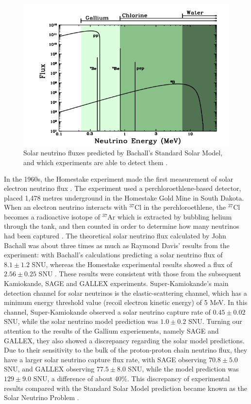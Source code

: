 \begin{figure}
    \centering
    \includegraphics[width=\textwidth]{Figures/nu_energy_bachall.png}
    \caption{Solar neutrino fluxes predicted by Bachall's Standard Solar Model, and which experiments are able to detect them \cite{Bahcall_2003}.}
    \label{fig:nu_energy_bachall}
\end{figure}

In the 1960s, the Homestake experiment made the first measurement of solar electron neutrino flux \cite{homestake_davis}. The experiment used a perchloroethlene-based detector, placed 1,478 metres underground in the Homestake Gold Mine in South Dakota. When an electron neutrino interacts with ${ }^{37} \mathrm{Cl}$ in the perchloroethlene, the ${ }^{37} \mathrm{Cl}$ becomes a radioactive isotope of ${ }^{37} \mathrm{Ar}$ which is extracted by bubbling helium through the tank, and then counted in order to determine how many neutrinos had been captured \cite{davis1994review}. The theoretical solar neutrino flux calculated by John Bachall was about three times as much as Raymond Davis' results from the experiment: with Bachall's calculations predicting a solar neutrino flux of $8.1 \pm 1.2$ SNU, whereas the Homestake experimental results showed a flux of $2.56 \pm 0.25$ SNU \cite{JKonijn1999}. These results were consistent with those from the subsequent Kamiokande, SAGE and GALLEX experiments. Super-Kamiokande's main detection channel for solar neutrinos is the elastic-scattering channel, which has a minimum energy threshold value (recoil electron kinetic energy) of 5 MeV. In this channel, Super-Kamiokande observed a solar neutrino capture rate of $0.45 \pm 0.02$ SNU, while the solar neutrino model prediction was $1.0 \pm 0.2$ SNU. Turning our attention to the results of the Gallium experiements, namely SAGE and GALLEX, they also showed a discrepancy regarding the solar model predictions. Due to their sensitivity to the bulk of the proton-proton chain neutrino flux, they have a larger solar neutrino capture flux rate, with SAGE observing $70.8 \pm 5.0$ SNU, and GALLEX observing $77.5 \pm 8.0$ SNU, while the model prediction was $129 \pm 9.0$ SNU, a difference of about 40\%. This discrepancy of experimental results compared with the Standard Solar Model prediction became known as the Solar Neutrino Problem \cite{Haxton_1995}. 

